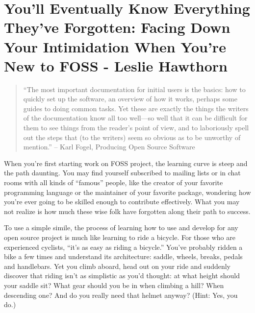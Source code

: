 \chapter{You’ll Eventually Know Everything They’ve Forgotten: Facing Down Your Intimidation When You’re New to FOSS - Leslie Hawthorn}
\begin{quote}
``The most important documentation for initial users is the basics: how to quickly set up the software, an overview of how it works, perhaps some guides to doing common tasks. Yet these are exactly the things the writers of the documentation know all too well—so well that it can be difficult for them to see things from the reader's point of view, and to laboriously spell out the steps that (to the writers) seem so obvious as to be unworthy of mention.'' -- Karl Fogel, Producing Open Source Software                                                                                                                                                                                                                                                                                                                                                                                                                                                                                                                       \end{quote}

When you’re first starting work on FOSS project, the learning curve is steep and the path daunting. You may find yourself subscribed to mailing lists or in chat rooms with all kinds of “famous” people, like the creator of your favorite programming language or the maintainer of your favorite package, wondering how you’re ever going to be skilled enough to contribute effectively. What you may not realize is how much these wise folk have forgotten along their path to success.

To use a simple simile, the process of learning how to use and develop for any open source project is much like learning to ride a bicycle. For those who are experienced cyclists, “it’s as easy as riding a bicycle.” You’ve probably ridden a bike a few times and understand its architecture: saddle, wheels, breaks, pedals and handlebars. Yet you climb aboard, head out on your ride and suddenly discover that riding isn’t as simplistic as you’d thought: at what height should your saddle sit? What gear should you be in when climbing a hill? When descending one? And do you really need that helmet anyway? (Hint: Yes, you do.) 

